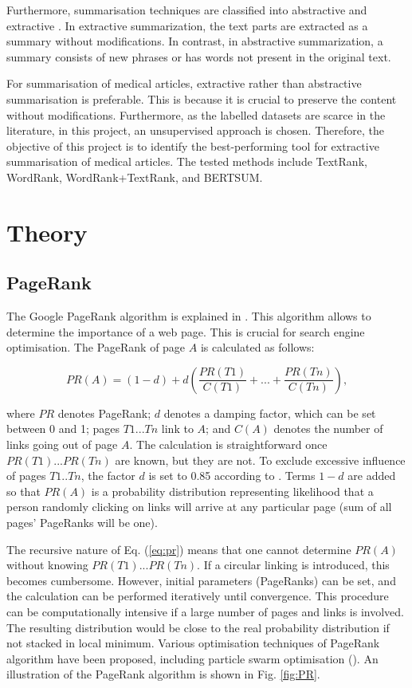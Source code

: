 \documentclass[11pt]{article}
\begin{document}
Furthermore, summarisation techniques are classified into abstractive and extractive \citep{widyassari2019literature}. In extractive summarization, the text parts are extracted as a summary without modifications. In contrast, in abstractive summarization, a summary consists of new phrases or has words not present in the original text.

For summarisation of medical articles, extractive rather than abstractive summarisation is preferable. This is because it is crucial to preserve the content without modifications. Furthermore, as the labelled datasets are scarce in the literature, in this project, an unsupervised approach is chosen. Therefore, the objective of this project is to identify the best-performing tool for extractive summarisation of medical articles. The tested methods include TextRank, WordRank, WordRank+TextRank, and BERTSUM.

\section{Theory}
\subsection{PageRank}

The Google PageRank algorithm is explained in \citet{rogers2002google}. This algorithm allows to determine the importance of a web page. This is crucial for search engine optimisation. The PageRank of page $A$ is calculated as follows:

\begin{small}
\begin{equation}
 PR(A) = (1-d) + d \left(\frac{PR(T1)}{C(T1)} + ... + \frac{PR(Tn)}{C(Tn)}\right),
 \label{eq:pr}
\end{equation}
\end{small}
where $PR$ denotes PageRank; $d$ denotes a damping factor, which can be set between 0 and 1; pages $T1...Tn$ link to $A$; and $C(A)$ denotes the number of links going out of page $A$. The calculation is straightforward once $PR(T1)...PR(Tn)$ are known, but they are not. To exclude excessive influence of pages $T1..Tn$, the factor $d$ is set to 0.85 according to \citet{rogers2002google}. Terms $1-d$ are added so that $PR(A)$ is a probability distribution representing likelihood that a person randomly clicking on links will arrive at any particular page (sum of all pages' PageRanks will be one).

The recursive nature of Eq. (\ref{eq:pr}) means that one cannot determine $PR(A)$ without knowing $PR(T1)...PR(Tn)$. If a circular linking is introduced, this becomes cumbersome. However, initial parameters (PageRanks) can be set, and the calculation can be performed iteratively until convergence. This procedure can be computationally intensive if a large number of pages and links is involved. The resulting distribution would be close to the real probability distribution if not stacked in local minimum. Various optimisation techniques of PageRank algorithm have been proposed, including particle swarm optimisation (\citet{bastos2021inverse}).  An illustration of the PageRank algorithm is shown in Fig. \ref{fig:PR}.
\end{document}

